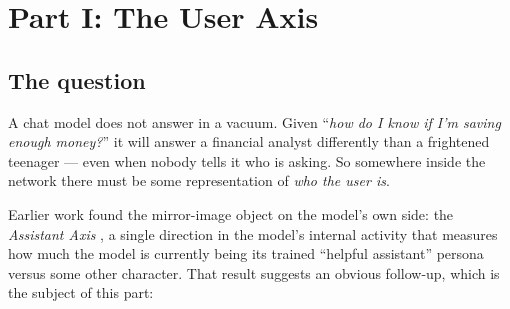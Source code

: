 \documentclass[11pt]{article}
\begin{document}
\begin{abstract}
out to matter far more than what is happening (72\% vs.\ 8\% of the
variance), though an acute emotional crisis can override even a cool expert's
standing treatment. Part~IV changes instruments entirely:
on four chat models, asking the model to \emph{write down} the character it is
about to play shows the written persona is stable and predictive --- but only
the reply written with the persona in front of it actually delivers it. Cold
replies keep the competence and drop the warmth; the written persona works as
a commitment device, and a closed 40-adjective trait vocabulary halves that
delivery gap while leaving the effect intact in every model. Part~V finally
puts words and activations on the \emph{same} 600 inputs: the written
self-report recovers most of what the probes read (noise-corrected agreement
up to $0.84$) --- with one principled exception. Emotional Stability, reliable
and user-driven inside the network, is invisible to the self-report: the
model declares ``calm'' even while its internal state sits nearly three
standard deviations toward the anxious pole. Its self-knowledge is selective:
stance is reportable; state is not.
\end{abstract}


\clearpage
\section{Part I: The User Axis}

\subsection{The question}

A chat model does not answer in a vacuum. Given ``\emph{how do I know if I'm
saving enough money?}'' it will answer a financial analyst differently than a
frightened teenager --- even when nobody tells it who is asking. So somewhere
inside the network there must be some representation of \emph{who the user is}.

Earlier work found the mirror-image object on the model's own side: the
\emph{Assistant Axis} \citep{assistantaxis}, a single direction in the model's
internal activity that
measures how much the model is currently being its trained ``helpful assistant''
persona versus some other character. That result suggests an obvious follow-up,
which is the subject of this part:
\end{document}
